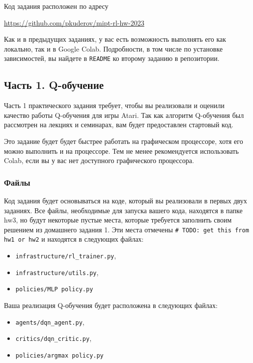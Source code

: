 \documentclass[12pt, oneside]{article}
\begin{document}
Код задания расположен по адресу
\begin{center}
    \href{https://github.com/pkuderov/mipt-rl-hw-2023}{https://github.com/pkuderov/mipt-rl-hw-2023}
\end{center}

Как и в предыдущих заданиях, у вас есть возможность выполнять его как локально, так и в Google Colab. Подробности, в том числе по установке зависимостей, вы найдете в \verb|README| ко второму заданию в репозитории.

\subsection{Часть 1. Q-обучение}

Часть 1 практического задания требует, чтобы вы реализовали и оценили качество работы Q-обучения для игры Atari. Так как алгоритм Q-обучения был рассмотрен на лекциях и семинарах, вам будет предоставлен стартовый код.

Это задание будет будет быстрее работать на графическом процессоре, хотя его можно выполнить и на процессоре. Тем не менее рекомендуется использовать Colab, если вы у вас нет доступного графического процессора.

\subsubsection{Файлы}

Код задания будет основываться на коде, который вы реализовали в первых двух заданиях. Все файлы, необходимые для запуска вашего кода, находятся в папке hw3, но будут некоторые пустые места, которые требуется заполнить своим решением из домашнего задания 1. Эти места отмечены \verb|# TODO: get this from hw1 or hw2| и находятся в следующих файлах:

\begin{itemize}
    \item \verb|infrastructure/rl_trainer.py|,
    \item \verb|infrastructure/utils.py|,
    \item \verb|policies/MLP policy.py|
\end{itemize}

Ваша реализация Q-обучения будет расположена в следующих файлах:

\begin{itemize}
    \item \verb|agents/dqn_agent.py|,
    \item \verb|critics/dqn_critic.py|,
    \item \verb|policies/argmax policy.py|
\end{itemize}
\end{document}
